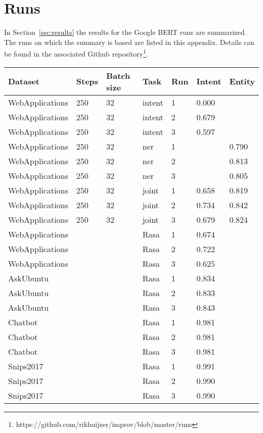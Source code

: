 \chapter{Runs}
\label{ch:runs}

In Section~\ref{sec:results} the results for the Google BERT runs are summarized.
The runs on which the summary is based are listed in this appendix.
Details can be found in the associated Github repository\footnote{https://github.com/rikhuijzer/improv/blob/master/runs}.\\

\begin{center}
    \begin{tabular}{l l l l l l l}
        \textbf{Dataset} & \textbf{Steps} & \textbf{Batch size} & \textbf{Task} & \textbf{Run} & \textbf{Intent} & \textbf{Entity} \\
        \hline
        WebApplications & 250 & 32 & intent & 1 & 0.000 \\
        WebApplications & 250 & 32 & intent & 2 & 0.679 \\
        WebApplications & 250 & 32 & intent & 3 & 0.597 \\
        WebApplications & 250 & 32 & ner & 1 & & 0.790 \\
        WebApplications & 250 & 32 & ner & 2 & & 0.813 \\
        WebApplications & 250 & 32 & ner & 3 & & 0.805 \\
        WebApplications & 250 & 32 & joint & 1 & 0.658 & 0.819 \\
        WebApplications & 250 & 32 & joint & 2 & 0.734 & 0.842 \\
        WebApplications & 250 & 32 & joint & 3 & 0.679 & 0.824 \\
        WebApplications & & & Rasa & 1 & 0.674 \\
        WebApplications & & & Rasa & 2 & 0.722 \\
        WebApplications & & & Rasa & 3 & 0.625 \\
        AskUbuntu & & & Rasa & 1 & 0.834 \\
        AskUbuntu & & & Rasa & 2 & 0.833 \\
        AskUbuntu & & & Rasa & 3 & 0.843 \\
        Chatbot & & & Rasa & 1 & 0.981 \\
        Chatbot & & & Rasa & 2 & 0.981 \\
        Chatbot & & & Rasa & 3 & 0.981 \\
        Snips2017 & & & Rasa & 1 & 0.991 \\
        Snips2017 & & & Rasa & 2 & 0.990 \\
        Snips2017 & & & Rasa & 3 & 0.990 \\
    \end{tabular}
\end{center}
